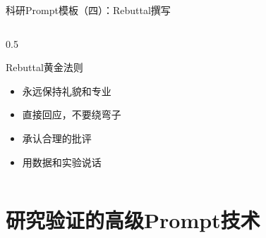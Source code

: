\documentclass[aspectratio=169,11pt]{beamer}
\begin{document}
\begin{frame}[fragile]{科研Prompt模板（四）：Rebuttal撰写}
\begin{columns}
\begin{column}{0.5\textwidth}
            \begin{alertblock}{Rebuttal黄金法则}
                \small
                \begin{itemize}
                    \item 永远保持礼貌和专业
                    \item 直接回应，不要绕弯子
                    \item 承认合理的批评
                    \item 用数据和实验说话
                \end{itemize}
            \end{alertblock}
        \end{column}
    \end{columns}
\end{frame}

\section{研究验证的高级Prompt技术}
\end{document}
